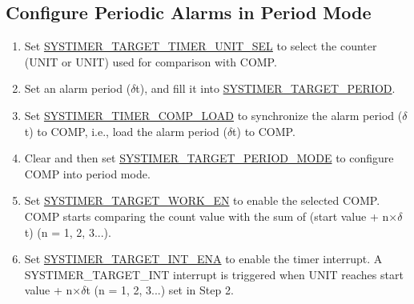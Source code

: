 \documentclass[main\_\_EN.tex]{subfiles}
\begin{document}
\subsection{Configure Periodic Alarms in Period Mode}
\begin{enumerate}
    \item Set \hyperref[fielddesc:SYSTIMERTARGET0TIMERUNITSEL]{SYSTIMER\_TARGET\_TIMER\_UNIT\_SEL} to select the counter (UNIT or UNIT) used for comparison with COMP.
    \item Set an alarm period ($\delta$t), and fill it into \hyperref[fielddesc:SYSTIMERTARGET0PERIOD]{SYSTIMER\_TARGET\_PERIOD}.
    \item Set \hyperref[fielddesc:SYSTIMERTIMERCOMP0LOAD]{SYSTIMER\_TIMER\_COMP\_LOAD} to synchronize the alarm period ($\delta$t) to COMP, i.e., load the alarm period ($\delta$t) to COMP.
    \item Clear and then set \hyperref[fielddesc:SYSTIMERTARGET0PERIODMODE]{SYSTIMER\_TARGET\_PERIOD\_MODE} to configure COMP into period mode.
    \item Set \hyperref[fielddesc:SYSTIMERTARGET0WORKEN]{SYSTIMER\_TARGET\_WORK\_EN} to enable the selected COMP. COMP starts comparing the count value with the sum of (start value + n×$\delta$t) (n = 1, 2, 3...).
    \item Set \hyperref[fielddesc:SYSTIMERTARGET0INTENA]{SYSTIMER\_TARGET\_INT\_ENA} to enable the timer interrupt. A SYSTIMER\_TARGET\_INT interrupt is triggered when UNIT reaches start value + n×$\delta$t (n = 1, 2, 3...) set in Step 2.
\end{enumerate}
\end{document}
